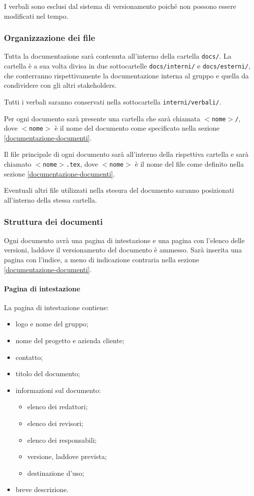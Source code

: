 \documentclass[a4paper, 12pt]{article}
\begin{document}
I verbali sono esclusi dal sistema di versionamento poiché non possono essere modificati nel tempo.

\subsubsection{Organizzazione dei file}
Tutta la documentazione sarà contenuta all'interno della cartella \texttt{docs/}. La cartella è a sua volta divisa in due sottocartelle \texttt{docs/interni/} e \texttt{docs/esterni/}, che conterranno rispettivamente la documentazione interna al gruppo e quella da condividere con gli altri stakeholders.

Tutti i verbali saranno conservati nella sottocartella \texttt{interni/verbali/}.

Per ogni documento sarà presente una cartella che sarà chiamata \texttt{$<$nome$>$/}, dove \texttt{$<$nome$>$} è il nome del documento come specificato nella sezione \ref{documentazione-documenti}.

Il file principale di ogni documento sarà all'interno della rispettiva cartella e sarà chiamato \texttt{$<$nome$>$.tex}, dove \texttt{$<$nome$>$} è il nome del file come definito nella sezione \ref{documentazione-documenti}.

Eventuali altri file utilizzati nella stesura del documento saranno posizionati all'interno della stessa cartella.

\subsubsection{Struttura dei documenti}
Ogni documento avrà una pagina di intestazione e una pagina con l'elenco delle versioni, laddove il versionamento del documento è ammesso.
Sarà inserita una pagina con l'indice, a meno di indicazione contraria nella sezione \ref{documentazione-documenti}.

\paragraph{Pagina di intestazione}
La pagina di intestazione contiene:
\begin{itemize}
\item logo e nome del gruppo;
\item nome del progetto e azienda cliente;
\item contatto;
\item titolo del documento;
\item informazioni sul documento:
\begin{itemize}
	\item elenco dei redattori;
	\item elenco dei revisori;
	\item elenco dei responsabili;
	\item versione, laddove prevista;
	\item destinazione d'uso;
\end{itemize}
\item breve descrizione.
\end{itemize}
\end{document}
